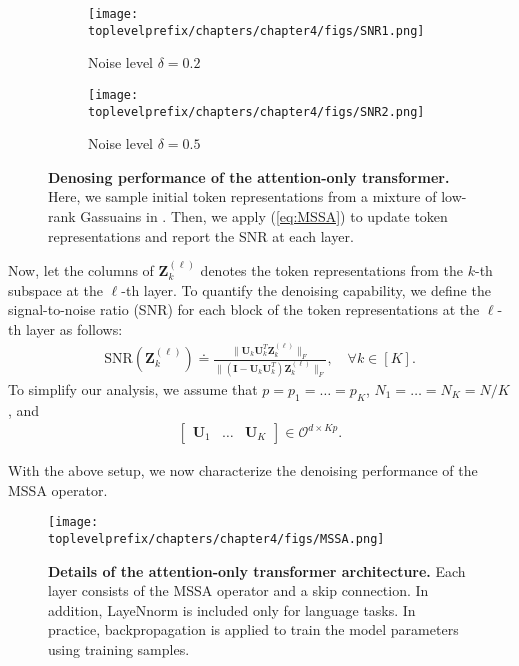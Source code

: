 \documentclass[../../book-main.tex]{subfiles}
\begin{document}
\begin{figure}[t]
    \begin{subfigure}[t]{0.45\textwidth}
        \centering
        \texttt{[image: \\toplevelprefix/chapters/chapter4/figs/SNR1.png]}
        \caption{Noise level $\delta = 0.2$}
    \end{subfigure}
    \hfill
    \begin{subfigure}[t]{0.45\textwidth}
        \centering
        \texttt{[image: \\toplevelprefix/chapters/chapter4/figs/SNR2.png]}
        \caption{Noise level $\delta = 0.5$}
    \end{subfigure}
    \caption{{\bf Denosing performance of the attention-only transformer.} Here, we sample initial token representations from a mixture of low-rank Gassuains in . Then, we apply (\ref{eq:MSSA}) to update token representations and report the SNR at each layer.}  \label{fig:MSSA} 
\end{figure} 


Now, let the columns of $\bm Z_k^{(\ell)}$ denotes the token representations from the $k$-th subspace at the $\ell$-th layer. To quantify the denoising capability, we define the signal-to-noise ratio (SNR) for each block of the token representations at the $\ell$-th layer as follows: 
\begin{align}\label{def:SNR}
\mathrm{SNR}(\bm Z_k^{(\ell)}) \doteq  \frac{\|\bm U_k\bm U_k^T\bm Z_k^{(\ell)} \|_F}{\|(\bm I - \bm U_k\bm U_k^T)\bm Z_k^{(\ell)} \|_F},\quad \forall k \in [K].
\end{align}
To simplify our analysis, we assume that $p=p_1=\dots=p_K$, $N_1=\dots=N_K=N/K$, and 
\begin{align}\label{eq:orth}
\begin{bmatrix}
\bm U_1 & \dots & \bm U_K
\end{bmatrix} \in \mathcal{O}^{d\times Kp}. 
\end{align}  

With the above setup, we now characterize the denoising performance of the MSSA operator.

\begin{figure*}[t]
\begin{center}
        \texttt{[image: \\toplevelprefix/chapters/chapter4/figs/MSSA.png]}
    \caption{\textbf{Details of the attention-only transformer architecture.} Each layer consists of the MSSA operator and a skip connection. In addition, LayeNnorm is included only for language tasks. In practice, backpropagation is applied to train the model parameters using training samples. %
    }\label{fig:transformer}
\end{center} 
\end{figure*}
\end{document}
